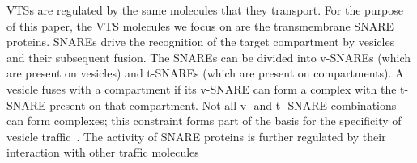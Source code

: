 %
VTSs are regulated by the same molecules that they transport.
%
For the purpose of this paper, the VTS molecules we focus on are the transmembrane SNARE proteins.
%
SNAREs drive the recognition of the target compartment by vesicles and
their subsequent fusion.
%
The SNAREs can be divided into v-SNAREs (which are present
on vesicles) and t-SNAREs (which are present on compartments). A
vesicle fuses with a compartment if its v-SNARE can form a complex
with the t-SNARE present on that compartment.
%
Not all v- and t- SNARE combinations can form complexes; this
constraint forms part of the basis for the specificity of vesicle
traffic~\cite{jahn2006snares}.
%
The activity of SNARE proteins is further regulated by their
interaction with other traffic molecules 
%

